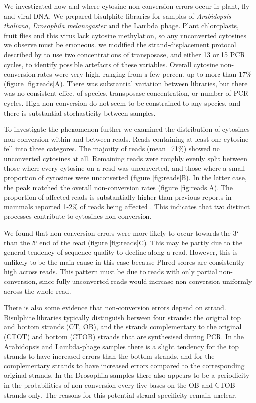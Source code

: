 \documentclass[twocolumn,twoside,lettersize]{article}
\begin{document}
We investigated how and where cytosine non-conversion errors occur in plant, fly and viral DNA.
We prepared bisulphite libraries for samples of \textit{Arabidopsis thaliana}, \textit{Drosophila melanogaster} and the Lambda phage.
Plant chloroplasts, fruit flies and this virus lack cytosine methylation, so any unconverted cytosines we observe must be erroneous.
we modified the strand-displacement protocol described by \textcite{weichenhan2019generation} to use two concentrations of transposase, and either 13 or 15 PCR cycles, to identify possible artefacts of these variables.
Overall cytosine non-conversion rates were very high, ranging from a few percent up to more than 17\% (figure \ref{fig:reads}A).
There was substantial variation between libraries, but there was no consistent effect of species, transposase concentration, or number of PCR cycles.
High non-conversion do not seem to be constrained to any species, and there is substantial stochasticity between samples.

To investigate the phenomenon further we examined the distribution of cytosines non-conversion within and between reads.
Reads containing at least one cytosine fell into three categores.
The majority of reads (mean=71\%) showed no unconverted cytosines at all.
Remaining reads were roughly evenly split between those where every cytosine on a read was unconverted, and those where a small proportion of cytosines were unconverted (figure \ref{fig:reads}B).
In the latter case, the peak matched the overall non-conversion rates (figure \ref{fig:reads}A).
The proportion of affected reads is substantially higher than previous reports in mammals reported 1-2\% of reads being affected \parencite{lu2015improved, suzuki2018whole}.
This indicates that two distinct processes contribute to cytosines non-conversion.

We found that non-conversion errors were more likely to occur towards the 3` than the 5` end of the read (figure \ref{fig:reads}C).
This may be partly due to the general tendency of sequence quality to decline along a read.
However, this is unlikely to be the main cause in this case because Phred scores are consistently high across reads.
This pattern must be due to reads with only partial non-conversion, since fully unconverted reads would increase non-conversion uniformly across the whole read.

There is also some evidence that non-conversion errors depend on strand.
Bisulphite libraries typically distinguish between four strands: the original top and bottom strands (OT, OB), and the strands complementary to the original (CTOT) and bottom (CTOB) strands that are synthesised during PCR.
In the Arabidopsis and Lambda-phage samples there is a slight tendency for the top strands to have increased errors than the bottom strands, and for the complementary strands to have increased errors compared to the corresponding original strands.
In the Drosophila samples there also appears to be a periodicity in the probabilities of non-conversion every five bases on the OB and CTOB strands only.
The reasons for this potential strand specificity remain unclear.
\end{document}
